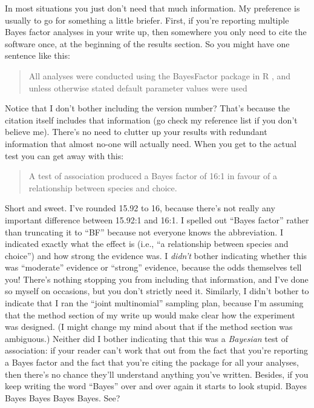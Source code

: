In most situations you just don't need that much information. My preference is usually to go for something a little briefer. First, if you're reporting multiple Bayes factor analyses in your write up, then somewhere you only need to cite the software once, at the beginning of the results section. So you might have one sentence like this:
\begin{quote}
All analyses were conducted using the BayesFactor package in R \cite{Morey2015}, and unless otherwise stated default parameter values were used
\end{quote}
Notice that I don't bother including the version number? That's because the citation itself includes that information (go check my reference list if you don't believe me). There's no need to clutter up your results with redundant information that almost no-one will actually need. When you get to the actual test you can get away with this:
\begin{quote}
A test of association produced a Bayes factor of 16:1 in favour of a relationship between species and choice.
\end{quote}
Short and sweet. I've rounded 15.92 to 16, because there's not really any important difference between 15.92:1 and 16:1. I spelled out ``Bayes factor'' rather than truncating it to ``BF'' because not everyone knows the abbreviation. I indicated exactly what the effect is (i.e., ``a relationship between species and choice'') and how strong the evidence was. I {\it didn't} bother indicating whether this was ``moderate'' evidence or ``strong'' evidence, because the odds themselves tell you! There's nothing stopping you from including that information, and I've done so myself on occasions, but you don't strictly need it. Similarly, I didn't bother to indicate that I ran the ``joint multinomial'' sampling plan, because I'm assuming that the method section of my write up would make clear how the experiment was designed. (I might change my mind about that if the method section was ambiguous.) Neither did I bother indicating that this was a {\it Bayesian} test of association: if your reader can't work that out from the fact that you're reporting a Bayes factor and the fact that you're citing the  package for all your analyses, then there's no chance they'll understand anything you've written. Besides, if you keep writing the word ``Bayes'' over and over again it starts to look stupid. Bayes Bayes Bayes Bayes Bayes. See?




